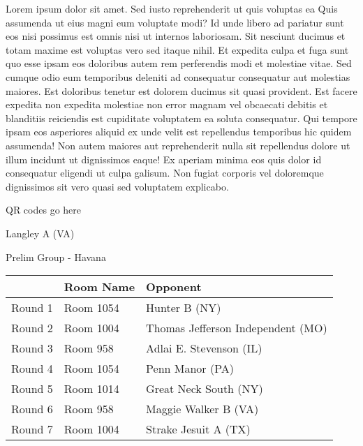 \documentclass{article}%
\begin{document}
\vspace*{8pt}%
\linebreak%
\newline%
\newline%
Lorem ipsum dolor sit amet. Sed iusto reprehenderit ut quis voluptas ea Quis assumenda ut eius magni eum voluptate modi? Id unde libero ad pariatur sunt eos nisi possimus est omnis nisi ut internos laboriosam. Sit nesciunt ducimus et totam maxime est voluptas vero sed itaque nihil. Et expedita culpa et fuga sunt quo esse ipsam eos doloribus autem rem perferendis modi et molestiae vitae.\newline%
\newline%
Sed cumque odio eum temporibus deleniti ad consequatur consequatur aut molestias maiores. Est doloribus tenetur est dolorem ducimus sit quasi provident. Est facere expedita non expedita molestiae non error magnam vel obcaecati debitis et blanditiis reiciendis est cupiditate voluptatem ea soluta consequatur. Qui tempore ipsam eos asperiores aliquid ex unde velit est repellendus temporibus hic quidem assumenda!\newline%
\newline%
Non autem maiores aut reprehenderit nulla sit repellendus dolore ut illum incidunt ut dignissimos eaque! Ex aperiam minima eos quis dolor id consequatur eligendi ut culpa galisum. Non fugiat corporis vel doloremque dignissimos sit vero quasi sed voluptatem explicabo.\newline%
\newline%
%
\vspace*{30pt}%
\begin{center}%
\begin{Huge}%
QR codes go here%
\end{Huge}%
\end{center}%
\newpage%
%
\begin{center}%
\begin{Huge}%
Langley A (VA)%
\end{Huge}%
\vspace*{8pt}%
\linebreak%
\begin{Large}%
Prelim Group {-} Havana%
\end{Large}%
\end{center}%
\begin{tabularx}{\textwidth}{|c|Y|Y|}%
\hline%
&Room Name&Opponent\\%
\hline%
Round 1&Room 1054&Hunter B (NY)\\%
Round 2&Room 1004&Thomas Jefferson Independent (MO)\\%
Round 3&Room 958&Adlai E. Stevenson (IL)\\%
Round 4&Room 1054&Penn Manor (PA)\\%
Round 5&Room 1014&Great Neck South (NY)\\%
Round 6&Room 958&Maggie Walker B (VA)\\%
Round 7&Room 1004&Strake Jesuit A (TX)\\%
\hline%
\end{tabularx}%
\end{document}
